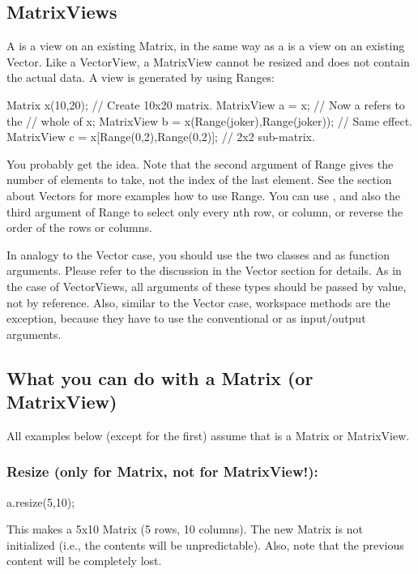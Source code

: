 \subsection{MatrixViews}

A  is a view on an existing Matrix, in the same way
as a  is a view on an existing Vector. Like a
VectorView, a MatrixView cannot be resized and does not contain the
actual data. A view is generated by using Ranges:

\begin{code}
Matrix x(10,20);                  // Create 10x20 matrix.
MatrixView a = x;                 // Now a refers to the
                                  // whole of x;
MatrixView b = x(Range(joker),Range(joker));
                                  // Same effect.
MatrixView c = x[Range(0,2),Range(0,2)];
                                  // 2x2 sub-matrix.
\end{code}

You probably get the idea. Note that the second argument of Range gives
the number of elements to take, not the index of the last element. See
the section about Vectors for more examples how to use Range. You can
use , and also the third argument of Range to select only
every nth row, or column, or reverse the order of the rows or columns.

In analogy to the Vector case, you should use the two classes
 and  as function arguments.
Please refer to the discussion in the Vector section for details. As
in the case of VectorViews, all arguments of these types should be
passed by value, not by reference. Also, similar to the Vector case,
workspace methods are the exception, because they have to use the
conventional  or  as input/output
arguments.

\subsection{What you can do with a Matrix (or MatrixView)}

All examples below (except for the first) assume that  is a
Matrix or MatrixView.

\subsubsection{Resize (only for Matrix, not for MatrixView!):}
\begin{code}
a.resize(5,10);
\end{code}
This makes  a 5x10 Matrix (5 rows, 10 columns). The new Matrix
is not initialized (i.e., the contents will be unpredictable). Also,
note that the previous content will be completely lost.

